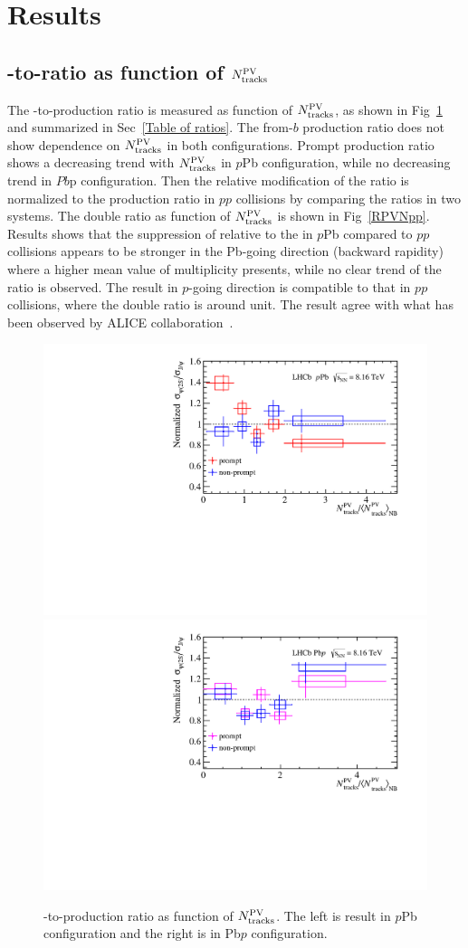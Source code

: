 \section{Results}
\label{Results}
\subsection{\psitwos-to-\jpsi ratio as function of $N^{\rm PV}_{\rm tracks}$}
The \psitwos-to-\jpsi production ratio is measured as function of $N^{\rm PV}_{\rm tracks}$, as shown in Fig~\ref{RPVN} and summarized in Sec~\ref{Table of ratios}. The from-$b$ production ratio does not show dependence on $N^{\rm PV}_{\rm tracks}$ in both configurations. Prompt production ratio shows a decreasing trend with $N^{\rm PV}_{\rm tracks}$ in $p$Pb configuration, while no decreasing trend in $Pb$p configuration.
Then the relative modification of the ratio is normalized to the production ratio in $pp$ collisions by comparing the ratios in two systems. The double ratio as function of $N^{\rm PV}_{\rm tracks}$ is shown in Fig~\ref{RPVNpp}. Results shows that the suppression of \psitwos relative to the \jpsi in $p$Pb compared to $pp$ collisions appears to be stronger in the Pb-going direction (backward rapidity) where a higher mean value of multiplicity presents, while no clear trend of the ratio is observed. The result in $p$-going direction is compatible to that in $pp$ collisions, where the double ratio is around unit. The result agree with what has been observed by ALICE collaboration~\cite{ALICE:2020tsj}.
\begin{figure}[H]
  \begin{center}
    \includegraphics[width=0.49\linewidth]{pdf/pPb/Workdir/Result/All.pdf}
    \includegraphics[width=0.49\linewidth]{pdf/Pbp/Workdir/Result/All.pdf}
    \vspace*{-0.5cm}
  \end{center}
  \caption{\psitwos-to-\jpsi production ratio as function of $N^{\rm PV}_{\rm tracks}$. The left is result in $p$Pb configuration and the right is in Pb$p$ configuration.
    }
  \label{RPVN}
\end{figure}

